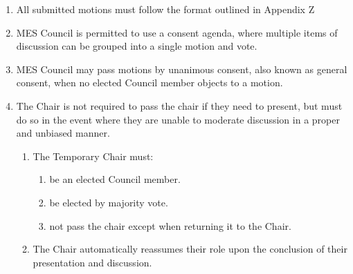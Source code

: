 \begin{enumerate}
 \item
  All submitted motions must follow the format outlined in Appendix Z
 \item
  MES Council is permitted to use a consent agenda, where multiple items of discussion can be grouped into a single motion and vote.
 \item
  MES Council may pass motions by unanimous consent, also known as general consent, when no elected Council member objects to a motion.
 \item
  The Chair is not required to pass the chair if they need to present, but must do so in the event where they are unable to moderate discussion in a proper and unbiased manner.
  \begin{enumerate}
   \item
    The Temporary Chair must:
    \begin{enumerate}
     \item
      be an elected Council member.
     \item
      be elected by majority vote.
     \item
      not pass the chair except when returning it to the Chair.
    \end{enumerate}
   \item
    The Chair automatically reassumes their role upon the conclusion of their presentation and discussion.
  \end{enumerate}

\end{enumerate}

